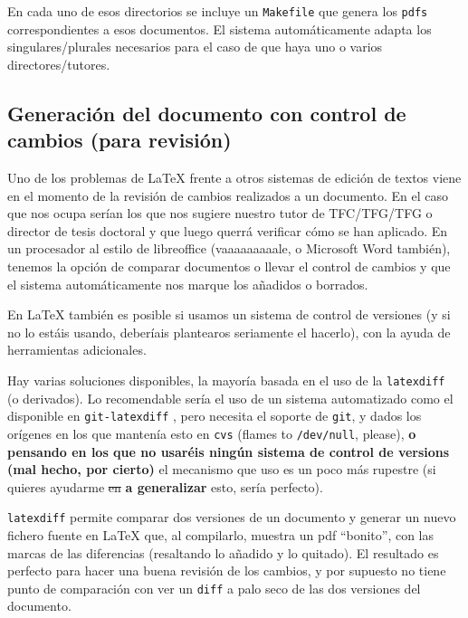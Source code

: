 \documentclass[spanish,openright]{book}
\providecommand{\DIFadd}[1]{{\protect\color{blue}\textbf{#1}}}
\providecommand{\DIFdel}[1]{{\protect\color{red}\sout{#1}}}
\providecommand{\DIFaddtex}[1]{{\protect\color{blue}\uwave{#1}}} %
\providecommand{\DIFdeltex}[1]{{\protect\color{red}\sout{#1}}}                      %
\providecommand{\DIFaddbegin}{} %
\providecommand{\DIFaddend}{} %
\providecommand{\DIFdelbegin}{} %
\providecommand{\DIFdelend}{} %
\providecommand{\DIFadd}[1]{\texorpdfstring{\DIFaddtex{#1}}{#1}} %
\providecommand{\DIFdel}[1]{\texorpdfstring{\DIFdeltex{#1}}{}} %
\newcommand{\DIFscaledelfig}{0.5}
\newlength{\DIFdelgraphicswidth} %
\newlength{\DIFdelgraphicsheight} %
\newcommand{\DIFaddincludegraphics}[2][]{{\color{blue}\fbox{\DIFOincludegraphics[#1]{#2}}}} %
\newcommand{\DIFdelincludegraphics}[2][]{%
\sbox{\DIFdelgraphicsbox}{\DIFOincludegraphics[#1]{#2}}%
\settoboxwidth{\DIFdelgraphicswidth}{\DIFdelgraphicsbox} %
\settoboxtotalheight{\DIFdelgraphicsheight}{\DIFdelgraphicsbox} %
\scalebox{\DIFscaledelfig}{%
\parbox[b]{\DIFdelgraphicswidth}{\usebox{\DIFdelgraphicsbox}\\[-\baselineskip] \rule{\DIFdelgraphicswidth}{0em}}\llap{\resizebox{\DIFdelgraphicswidth}{\DIFdelgraphicsheight}{%
\setlength{\unitlength}{\DIFdelgraphicswidth}%
\begin{picture}(1,1)%
\thicklines\linethickness{2pt} %
{\color[rgb]{1,0,0}\put(0,0){\framebox(1,1){}}}%
{\color[rgb]{1,0,0}\put(0,0){\line( 1,1){1}}}%
{\color[rgb]{1,0,0}\put(0,1){\line(1,-1){1}}}%
\end{picture}%
}\hspace*{3pt}}} %
} %
\DeclareRobustCommand{\DIFaddbegin}{\DIFOaddbegin \let\includegraphics\DIFaddincludegraphics} %
\DeclareRobustCommand{\DIFaddend}{\DIFOaddend \let\includegraphics\DIFOincludegraphics} %
\DeclareRobustCommand{\DIFdelbegin}{\DIFOdelbegin \let\includegraphics\DIFdelincludegraphics} %
\DeclareRobustCommand{\DIFdelend}{\DIFOaddend \let\includegraphics\DIFOincludegraphics} %
\begin{document}
En cada uno de esos directorios se incluye un \texttt{Makefile} que
genera los \texttt{pdfs} correspondientes a esos documentos. El
sistema automáticamente adapta los singulares/plurales necesarios para
el caso de que haya uno o varios directores/tutores.


\subsection{Generación del documento con control de cambios (para
revisión)}
\label{sec:control-de-cambios}

Uno de los problemas de \LaTeX{} frente a otros sistemas de edición de
textos viene en el momento de la revisión de cambios realizados a un
documento. En el caso que nos ocupa serían los que nos sugiere nuestro
tutor de TFC/TFG/TFG o director de tesis doctoral y que luego querrá
verificar cómo se han aplicado. En un procesador al estilo de
libreoffice (vaaaaaaaaale, o Microsoft Word también), tenemos la opción
de comparar documentos o llevar el control de cambios y que el sistema
automáticamente nos marque los añadidos o borrados.

En \LaTeX{} también es posible si usamos un sistema de control de
versiones (y si no lo estáis usando, deberíais plantearos seriamente el
hacerlo), con la ayuda de herramientas adicionales.

Hay varias soluciones disponibles, la mayoría basada en el uso de la
\texttt{latexdiff}\DIFaddbegin \DIFadd{~}\DIFaddend \cite{latexdiff} (o derivados). Lo recomendable
sería el uso de un sistema automatizado como el disponible en
\texttt{git-latexdiff} \cite{git-latexdiff}, pero necesita el soporte
de \texttt{git}, y dados los orígenes en los que mantenía esto en
\texttt{cvs} (flames to \texttt{/dev/null}, please), \DIFaddbegin \DIFadd{o pensando en los
que no usaréis ningún sistema de control de versions (mal hecho, por
cierto) }\DIFaddend el mecanismo que uso es un poco más rupestre (si quieres
ayudarme \DIFdelbegin \DIFdel{en }\DIFdelend \DIFaddbegin \DIFadd{a generalizar }\DIFaddend esto, sería perfecto).

\texttt{latexdiff} permite comparar dos versiones de un documento y
generar un nuevo fichero fuente en \LaTeX{} que, al compilarlo, muestra un
pdf ``bonito'', con las marcas de las diferencias (resaltando lo añadido
y lo quitado). El resultado es perfecto para hacer una buena revisión de
los cambios, y por supuesto no tiene punto de comparación con ver un
\texttt{diff} a palo seco de las dos versiones del documento.
\end{document}
